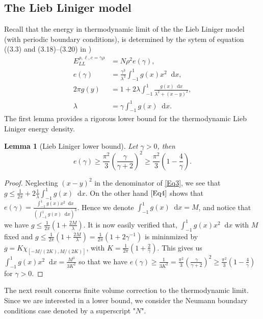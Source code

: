 \documentclass[a4paper,11pt]{article}
\newcommand*\diff{\mathop{}\!\mathrm{d}}
\newtheorem{lemma}{Lemma}
\numberwithin{equation}{section}
\begin{document}
	\subsection{The Lieb Liniger model}
	Recall that the energy in thermodynamic limit of the the Lieb Liniger model (with periodic boundary conditions), is determined by the sytem of equation ((3.3) and (3.18)--(3.20) in \cite{PhysRev.130.1605})
	\begin{align}
	E^{\rho,\ell,c=\gamma\rho}_{LL}&=N\rho^2 e(\gamma),\label{Eq1}\\
	e(\gamma)&=\frac{\gamma^3}{\lambda^3}\int_{-1}^{1}g(x)x^2\diff x,\label{Eq2}\\
	2\pi g(y)&=1+2\lambda\int_{-1}^{1}\frac{g(x)\diff x}{\lambda^2+(x-y)^2},\label{Eq3}\\
	\lambda&=\gamma\int_{-1}^{1}g(x)\diff x.\label{Eq4}
	\end{align}
	The first lemma provides a rigorous lower bound for the thermodynamic Lieb Liniger energy density. 
	\begin{lemma}[Lieb Liniger lower bound] \label{LemmaLL-LowerBound}
		Let $ \gamma>0 $, then
		\begin{equation}
		e(\gamma)\geq \frac{\pi^2}{3}\left(\frac{\gamma}{\gamma+2}\right)^2\geq \frac{\pi^2}{3}\left(1-\frac{4}{\gamma}\right).
		\end{equation}
	\end{lemma}
	\begin{proof}
		Neglecting $ (x-y)^2 $ in the denominator of \eqref{Eq3}, we see that $ g\leq \frac{1}{2\pi}+2\frac{1}{\lambda}\int_{-1}^{1}g(x)\diff x $. On the other hand $ \eqref{Eq4} $ shows that $ e(\gamma)=\frac{\int_{-1}^{1}g(x)x^2\diff x}{\left(\int_{-1}^{1}g(x)\diff x\right)^3} $. Hence we denote $ \int_{-1}^{1}g(x)\diff x=M $, and notice that we have $ g\leq \frac{1}{2\pi}\left(1+\frac{2M}{\lambda}\right) $. It is now easily verified that, $ \int_{-1}^{1}g(x)x^2\diff x $ with $ M $ fixed and $ g\leq \frac{1}{2\pi}\left(1+\frac{2M}{\lambda}\right)=\frac{1}{2\pi}\left(1+2\gamma^{-1}\right) $ is mininmized by $ g=K\chi_{[-M/(2K),M/(2K)]} $, with $ K=\frac{1}{2\pi}\left(1+\frac{2}{\gamma}\right) $. This gives us $ \int_{-1}^{1}g(x)x^2\diff x=\frac{M^3}{3K^2}$ so that we have $ e(\gamma)\geq \frac{1}{3K^2}=\frac{\pi^2}{3}\left(\frac{\gamma}{\gamma+2}\right)^2\geq \frac{\pi^2}{3}(1-\frac{4}{\gamma})$ for $ \gamma>0 $.
	\end{proof}
	The next result concerns finite volume correction to the thermodynamic limit. Since we are interested in a lower bound, we consider the Neumann boundary conditions case denoted by a superscript "$ N $".
\end{document}
